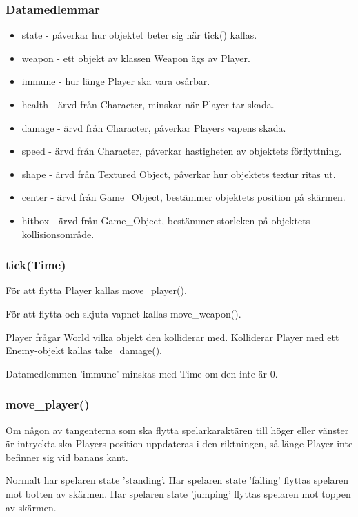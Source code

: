 \documentclass{TDP005mall}
\begin{document}
\subsubsection{Datamedlemmar}
\begin{itemize}
\item state - påverkar hur objektet beter sig när tick() kallas.
\item weapon - ett objekt av klassen Weapon ägs av Player.
\item immune - hur länge Player ska vara osårbar.
\item health - ärvd från Character, minskar när Player tar skada.
\item damage - ärvd från Character, påverkar Players vapens skada.
\item speed - ärvd från Character, påverkar hastigheten av objektets förflyttning.
\item shape - ärvd från Textured Object, påverkar hur objektets textur ritas ut.
\item center - ärvd från Game\_Object, bestämmer objektets position på skärmen.
\item hitbox - ärvd från Game\_Object, bestämmer storleken på objektets kollisionsområde.
\end{itemize}

\subsubsection{tick(Time)}
För att flytta Player kallas move\_player().

För att flytta och skjuta vapnet kallas move\_weapon().

Player frågar World vilka objekt den kolliderar med. Kolliderar Player med ett Enemy-objekt kallas take\_damage().

Datamedlemmen 'immune' minskas med Time om den inte är 0.

\subsubsection{move\_player()}
Om någon av tangenterna som ska flytta spelarkaraktären till höger eller vänster är intryckta ska Players position uppdateras i den riktningen, så länge Player inte befinner sig vid banans kant.

Normalt har spelaren state 'standing'. 
Har spelaren state 'falling' flyttas spelaren mot botten av skärmen. 
Har spelaren state 'jumping' flyttas spelaren mot toppen av skärmen.
\end{document}
